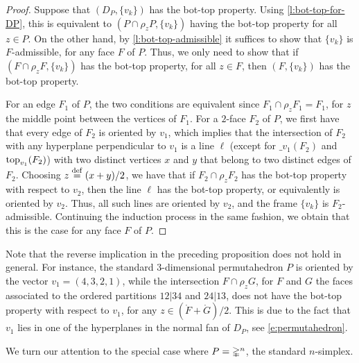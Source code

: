 \begin{proof}
	Suppose that $(D_P,\{v_k\})$ has the bot-top property.
	Using \cref{l:bot-top-for-DP}, this is equivalent to $(P\cap\rho_z P, \{v_k\})$ having the bot-top property for all $z \in P$.
	On the other hand, by \cref{l:bot-top-admissible} it suffices to show that $\{v_k\}$ is $F$-admissible, for any face $F$ of $P$.
	Thus, we only need to show that if $(F \cap \rho_z F, \{v_k\})$ has the bot-top property, for all $z \in F$, then $(F,\{v_k\})$ has the bot-top property.

	For an edge $F_1$ of $P$, the two conditions are equivalent since $F_1 \cap \rho_z F_1 = F_1$, for $z$ the middle point between the vertices of $F_1$.
	For a $2$-face $F_2$ of $P$, we first have that every edge of $F_2$ is oriented by $v_1$, which implies that the intersection of $F_2$ with any hyperplane perpendicular to $v_1$ is a line $\ell$ (except for $\bm_{v_1}(F_2)$ and $\operatorname{top}_{v_1}(F_2)$) with two distinct vertices $x$ and $y$ that belong to two distinct edges of $F_2$.
	Choosing $z \stackrel{\mathrm{def}}{=} (x+y)/2$, we have that if $F_2 \cap \rho_z F_2$ has the bot-top property with respect to $v_2$, then the line $\ell$ has the bot-top property, or equivalently is oriented by $v_2$.
	Thus, all such lines are oriented by $v_2$, and the frame $\{v_k\}$ is $F_2$-admissible.
	Continuing the induction process in the same fashion, we obtain that this is the case for any face $F$ of $P$.
\end{proof}

\begin{example}
	Note that the reverse implication in the preceding proposition does not hold in general.
	For instance, the standard $3$-dimensional permutahedron $P$ is oriented by the vector $v_1=(4,3,2,1)$, while the intersection $F \cap \rho_z G$, for $F$ and $G$ the faces associated to the ordered partitions $12|34$ and $24|13$, does not have the bot-top property with respect to $v_1$, for any $z \in (\mathring F + \mathring G)/2$.
	This is due to the fact that $v_1$ lies in one of the hyperplanes in the normal fan of $D_P$, see \cref{e:permutahedron}.
\end{example}



We turn our attention to the special case where $P = \mathbb{\Delta}^n$, the standard $n$-simplex.

